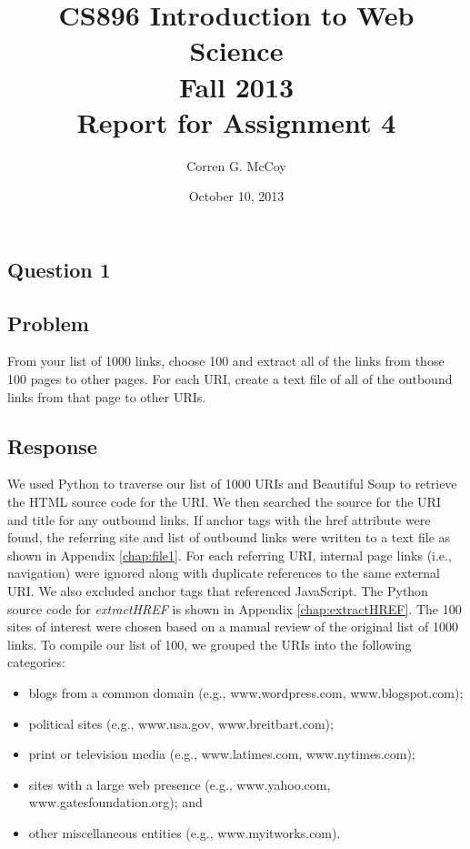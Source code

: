 \documentclass[letterpaper,11pt]{report}
\begin{document}
 
\begin{savenotes}
\pagestyle{plain}
\title{CS896 Introduction to Web Science\\Fall 2013\\Report for Assignment 4}
\author{Corren G. McCoy}
 
\date{October 10, 2013}
\maketitle

\renewcommand*\thesection{\arabic{section}}
\setcounter{section}{0}

\setcounter{tocdepth}{4}
\tableofcontents
 \listoffigures
\newpage


\section{Question 1}
\subsection{Problem}From your list of 1000 links, choose 100 and extract all of the links from those 100 pages to other pages. For each URI, create a text file of all of the outbound links from that page to other URIs.
\subsection{Response}We used Python to traverse our list of 1000 URIs and Beautiful Soup to retrieve the HTML source code for the URI. We then searched the source for the URI and title for any outbound links. If anchor tags with the href attribute were found, the referring site and list of outbound links were written to a text file as shown in Appendix \ref{chap:file1}.  For each referring URI, internal page links (i.e., navigation) were ignored along with duplicate references to the same external URI. We also excluded anchor tags that referenced JavaScript. The Python source code for \emph{extractHREF} is shown in Appendix \ref{chap:extractHREF}. The 100 sites of interest were chosen based on a manual review of the original list of 1000 links. To compile our list of 100, we grouped the URIs into the following categories:
\begin{itemize}
\item blogs from a common domain (e.g., www.wordpress.com, www.blogspot.com);
\item political sites (e.g., www.usa.gov, www.breitbart.com);
\item print or television media (e.g., www.latimes.com, www.nytimes.com);
\item sites with a large web presence (e.g., www.yahoo.com, www.gatesfoundation.org); and
\item other miscellaneous entities (e.g., www.myitworks.com).
\end{itemize}


\end{savenotes}
\end{document}
